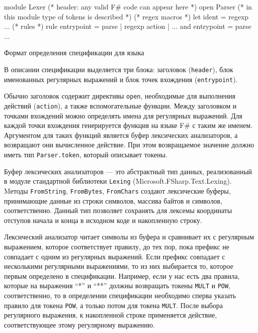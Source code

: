 \documentclass[10pt, conference, compsocconf]{IEEEtran}
\begin{document}
\begin{listing}[H]
\begin{pyglist}[language=ocaml,numbers=none,numbersep=5pt]
{
module Lexer
(* header: any valid F# code can appear here *)
open Parser (* in this module type of tokens 
is described *)
}
(* regex macros  *)
let ident = regexp ... 
(* rules *)
rule entrypoint = parse
| regexp { action }
| ... 
and entrypoint = parse
...
\end{pyglist}
\caption{Формат определения спецификации для языка}
\label{lst:format}
\end{listing}


В описании спецификации выделяется три блока: заголовок (\verb|header|), блок именованных регулярных выражений и блок точек вхождения (\verb|entrypoint|). 

Обычно заголовок содержит директивы \verb|open|, необходимые для выполнения действий (\verb|action|), а также вспомогательные функции. Между заголовком и точками вхождений можно определять имена для регулярных выражений. Для каждой точки вхождения генерируется функция на языке F\# с таким же именем. Аргументом для таких функций является буфер лексических анализаторов, а возвращают они вычисленное действие. При этом возвращаемое значение должно иметь тип \verb|Parser.token|, который описывает токены. 

Буфер лексических анализаторов --- это абстрактный тип данных,  реализованный в модуле стандартной библиотеки \verb|Lexing| (Microsoft.FSharp.Text.Lexing). Mетоды \verb|FromString|, \verb|FromBytes|, \verb|FromChars| создают лексические буферы, принимающие данные из строки символов, массива  байтов и символов, соответственно. Данный тип позволяет сохранять для лексемы координаты отступов начала и конца в исходном коде и накопленную строку. 

Лексический анализатор читает символы из буфера и сравнивает их с регулярным выражением, которое соответствует правилу, до тех пор, пока префикс не совпадает с одним  из регулярных выражений. Если префикс совпадает с несколькими регулярными выражениями, то из них выбирается то, которое первым определено в спецификации. Например, если у нас есть два правила, которые на выражения ``*'' и ``**'' должны возвращать токены \verb|MULT| и \verb|POW|, соответственно, то в определении спецификации необходимо сперва указать правило для токена \verb|POW|, а только потом для токена \verb|MULT|. После выбора регулярного выражения, к накопленной строке применяется действие, соответствующее этому регулярному выражению. 
\end{document}
